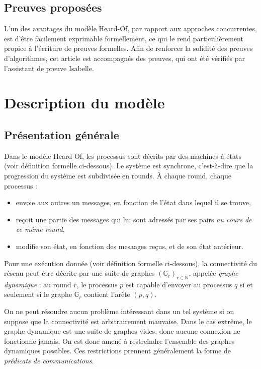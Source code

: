 \documentclass{article}
\begin{document}
\subsection{Preuves proposées}

L'un des avantages du modèle Heard-Of, par rapport aux approches concurrentes, est d'être facilement exprimable formellement, ce qui le rend particulièrement propice à l'écriture de preuves formelles.
Afin de renforcer la solidité des preuves d'algorithmes, cet article est accompagnés des preuves, qui ont été vérifiés par l'assistant de preuve Isabelle.

\section{Description du modèle}

\subsection{Présentation générale}

Dans le modèle Heard-Of, les processus sont décrits par des machines à états (voir définition formelle ci-dessous).
Le système est synchrone, c'est-à-dire que la progression du système est subdivisée en rounds. À chaque round, chaque processus :
\begin{itemize}
	\item envoie aux autres un messages, en fonction de l'état dans lequel il se trouve,
	\item reçoit une partie des messages qui lui sont adressés par ses pairs \emph{au cours de ce même round},
	\item modifie son état, en fonction des mesaages reçus, et de son état antérieur.
\end{itemize}

Pour une exécution donnée (voir définition formelle ci-dessous), la connectivité du réseau peut être décrite par une suite de graphes $(\mathds{G}_r)_{r \in \mathds{N}}$, appelée \textit{graphe dynamique} :
au round $r$, le processus $p$ est capable d'envoyer au processus $q$ si et seulement si le graphe $\mathds{G}_r$ contient l'arête $(p,q)$.

On ne peut résoudre aucun problème intéressant dans un tel système si on suppose que la connectivité est arbitrairement mauvaise. Dans le cas extrême, le graphe dynamique est une suite de graphes vides, 
donc aucune connexion ne fonctionne jamais.
On est donc amené à restreindre l'ensemble des graphes dynamiques possibles. Ces restrictions prennent généralement la forme de \emph{prédicats de communications}.
\end{document}
